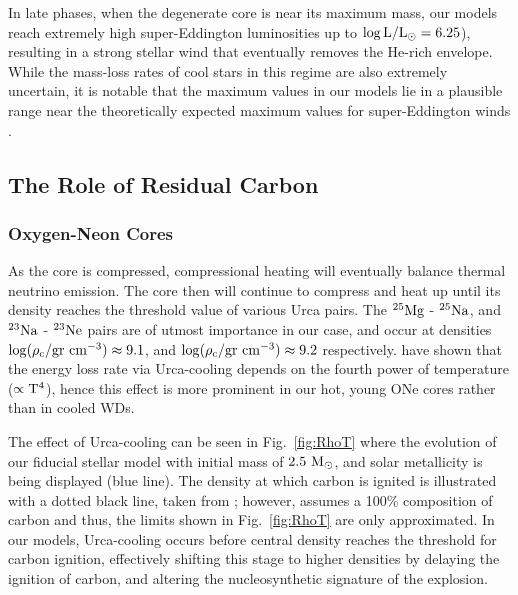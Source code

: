 \documentclass[../../main/thesis_msc.tex]{subfiles}
\begin{document}
In late phases, when the degenerate core is near its maximum mass, our models reach extremely high super-Eddington luminosities up to $\rm \log{L/L_\odot = 6.25}$), resulting in a strong stellar wind that eventually removes the He-rich envelope. While the mass-loss rates of cool stars in this regime are also extremely uncertain, it is notable that the maximum values in our models lie in a plausible range near the theoretically expected maximum values for super-Eddington winds \citep[][]{Owocki:2004zz,Smith2006}.
        
 



    \subsection{The Role of Residual Carbon} \label{sec:residualCarbon}
    
        \subsubsection{Oxygen-Neon Cores}
        
        As the core is compressed, compressional heating will eventually balance thermal neutrino emission. The core then will continue to compress and heat up until its density reaches the threshold value of various Urca pairs. The $\rm ^{25}Mg$ - $\rm ^{25}Na$, and $\rm ^{23}Na$ - $\rm ^{23}Ne$ pairs are of utmost importance in our case, and occur at densities $\rm \log(\rho_c / \rm gr \ cm^{-3}) \approx 9.1$, and $\rm \log(\rho_c / \rm gr \ cm^{-3}) \approx 9.2$ respectively. \cite{Tsuruta1970} have shown that the energy loss rate via Urca-cooling depends on the fourth power of temperature ($\rm \propto T^4$), hence this effect is more prominent in our hot, young ONe cores rather than in cooled WDs.
        
        The effect of Urca-cooling can be seen in Fig.\, \ref{fig:RhoT} where the evolution of our fiducial stellar model with initial mass of $2.5 \rm \  M_{\odot}$, and solar metallicity is being displayed (blue line). The density at which carbon is ignited is illustrated with a dotted black line, taken from \mesa; however, \mesa assumes a 100\% composition of carbon and thus, the limits shown in Fig.\, \ref{fig:RhoT} are only approximated. In our models, Urca-cooling occurs before central density reaches the threshold for carbon ignition, effectively shifting this stage to higher densities by delaying the ignition of carbon, and altering the nucleosynthetic signature of the explosion. 
        
\end{document}

